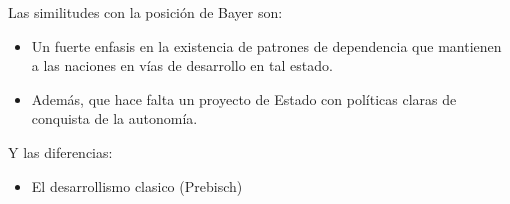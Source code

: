  Las similitudes con la posición de Bayer son:

 \begin{itemize}
     \item Un fuerte enfasis en la existencia de patrones de dependencia que mantienen a las naciones en vías de desarrollo en tal estado.
     \item Además, que hace falta un proyecto de Estado con políticas claras de conquista de la autonomía.
 \end{itemize}

 Y las diferencias:

 \begin{itemize}
     \item El desarrollismo clasico (Prebisch)
 \end{itemize}
